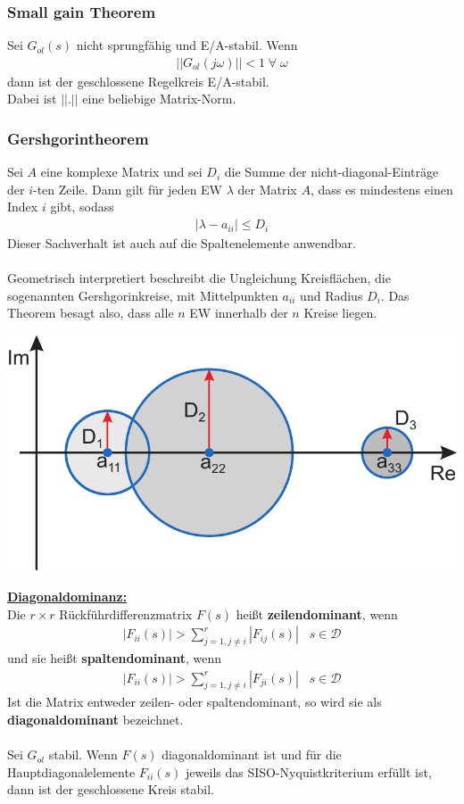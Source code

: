 \documentclass[a4paper,twocolumn,10pt]{article}
\begin{document}
\subsubsection{Small gain Theorem}
Sei $G_{ol}(s)$ nicht sprungfähig und E/A-stabil. Wenn
\begin{align*}
||G_{ol}(j\omega)||<1\;\forall\;\omega
\end{align*}
dann ist der geschlossene Regelkreis E/A-stabil.\\
Dabei ist $||.||$ eine beliebige Matrix-Norm.

\subsubsection{Gershgorintheorem}
Sei $A$ eine komplexe Matrix und sei $D_i$ die Summe der nicht-diagonal-Einträge der $i$-ten Zeile. Dann gilt für jeden EW $\lambda$ der Matrix $A$, dass es mindestens einen Index $i$ gibt, sodass
\begin{align*}
|\lambda-a_{ii}|\leq D_i
\end{align*}
Dieser Sachverhalt ist auch auf die Spaltenelemente anwendbar.\\\\
Geometrisch interpretiert beschreibt die Ungleichung Kreisflächen, die sogenannten Gershgorinkreise, mit Mittelpunkten $a_{ii}$ und Radius $D_i$. Das Theorem besagt also, dass alle $n$ EW innerhalb der $n$ Kreise liegen.
\begin{center}
\includegraphics[width=0.95\columnwidth]{Grafiken/Gershgorintheorem}
\end{center}
\underline{\textbf{Diagonaldominanz:}}\\
Die $r\times r$ Rückführdifferenzmatrix $F(s)$ heißt \textbf{zeilendominant}, wenn
\begin{align*}
|F_{ii}(s)|>\sum\limits_{j=1,j\neq i}^r|F_{ij}(s)|\;\;\;s\in\mathcal{D}
\end{align*}
und sie heißt \textbf{spaltendominant}, wenn
\begin{align*}
|F_{ii}(s)|>\sum\limits_{j=1,j\neq i}^r|F_{ji}(s)|\;\;\;s\in\mathcal{D}
\end{align*}
Ist die Matrix entweder zeilen- oder spaltendominant, so wird sie als \textbf{diagonaldominant} bezeichnet.\\\\
Sei $G_{ol}$ stabil. Wenn $F(s)$ diagonaldominant ist und für die Hauptdiagonalelemente $F_{ii}(s)$ jeweils das SISO-Nyquistkriterium erfüllt ist, dann ist der geschlossene Kreis stabil.
\end{document}
